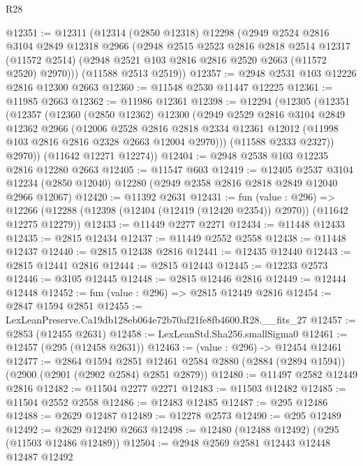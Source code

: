 \begin{lexlean}{R28}
\begin{coremodule}
@12351 := @12311
    (@12314
      (@2850 @12318)
      @12298
      (@2949
        @2524
        @2816
        @3104
        @2849
        @12318
        @2966
        (@2948
          @2515
          @2523
          @2816
          @2818
          @2514
          @12317
          (@11572 @2514)
          (@2948 @2521 @103 @2816 @2816 @2520 @2663 (@11572 @2520) @2970)))
      (@11588 @2513 @2519))
@12357 := @2948 @2531 @103 @12226 @2816 @12300 @2663
@12360 := @11548 @2530 @11447 @12225
@12361 := @11985 @2663
@12362 := @11986 @12361
@12398 := @12294
    (@12305
      (@12351
        (@12357
          (@12360
            (@2850 @12362)
            @12300
            (@2949
              @2529
              @2816
              @3104
              @2849
              @12362
              @2966
              (@12006
                @2528
                @2816
                @2818
                @2334
                @12361
                @12012
                (@11998 @103 @2816 @2816 @2328 @2663 @12004 @2970)))
            (@11588 @2333 @2327))
          @2970))
      (@11642 @12271 @12274))
@12404 := @2948 @2538 @103 @12235 @2816 @12280 @2663
@12405 := @11547 @603
@12419 := @12405
    @2537
    @3104
    @12234
    (@2850 @12040)
    @12280
    (@2949 @2358 @2816 @2818 @2849 @12040 @2966 @12067)
@12420 := @11392 @2631
@12431 := fun (value : @296) =>
  @12266 (@12288 (@12398 (@12404 (@12419 (@12420 @2354)) @2970)) (@11642 @12275 @12279))
@12433 := @11449 @2277 @2271
@12434 := @11448 @12433
@12435 := @2815 @12434
@12437 := @11449 @2552 @2558
@12438 := @11448 @12437
@12440 := @2815 @12438 @2816
@12441 := @12435 @12440
@12443 := @2815 @12441 @2816
@12444 := @2815 @12443
@12445 := @12233 @2573
@12446 := @3105 @12445
@12448 := @2815 @12446 @2816
@12449 := @12444 @12448
@12452 := fun (value : @296) => @2815 @12449 @2816
@12454 := @2847 @1594 @2851
@12455 := LexLeanPreserve.Ca19db128eb064e72b70af21fe8fb4600.R28.__fits_27
@12457 := @2853 (@12455 @2631)
@12458 := LexLeanStd.Sha256.smallSigma0
@12461 := @12457 (@295 (@12458 @2631))
@12463 := (value : @296) -> @12454 @12461
@12477 := @2864
    @1594
    @2851
    @12461
    @2584
    @2880
    (@2884 (@2894 @1594))
    (@2900 (@2901 (@2902 @2584) @2851 @2879))
@12480 := @11497 @2582 @12449 @2816
@12482 := @11504 @2277 @2271
@12483 := @11503 @12482
@12485 := @11504 @2552 @2558
@12486 := @12483 @12485
@12487 := @295 @12486
@12488 := @2629 @12487
@12489 := @12278 @2573
@12490 := @295 @12489
@12492 := @2629 @12490 @2663
@12498 := @12480 (@12488 @12492) (@295 (@11503 @12486 @12489))
@12504 := @2948 @2569 @2581 @12443 @12448 @12487 @12492

\end{coremodule}
\end{lexlean}
